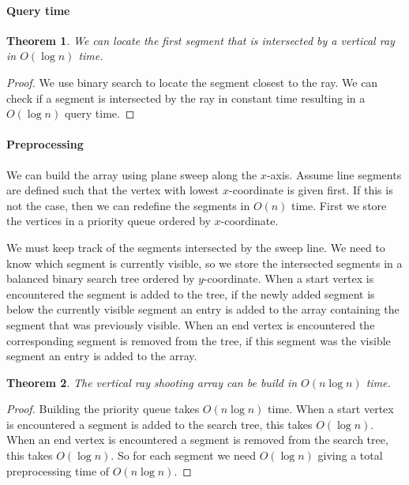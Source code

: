 \documentclass[10pt,a4paper,final,oneside,openany,article,oldfontcommands]{memoir}
\newtheorem{rayshooting}{Theorem}
\begin{document}
\paragraph{Query time}
\begin{rayshooting}
  We can locate the first segment that is intersected by a vertical ray in $O(\log n)$ time.
\end{rayshooting}
\begin{proof}
We use binary search to locate the segment closest to the ray. We can check if a segment is intersected by the ray in constant time resulting in a $O(\log n)$ query time.
\end{proof}


\paragraph{Preprocessing}
We can build the array using plane sweep along the $x$-axis. Assume line segments are defined such that the vertex with lowest $x$-coordinate is given first. If this is not the case, then we can redefine the segments in $O(n)$ time. First we store the vertices in a priority queue ordered by $x$-coordinate.

We must keep track of the segments intersected by the sweep line. We need to know which segment is currently visible, so we store the intersected segments in a balanced binary search tree ordered by $y$-coordinate.
When a start vertex is encountered the segment is added to the tree, if the newly added segment is below the currently visible segment an entry is added to the array containing the segment that was previously visible.
When an end vertex is encountered the corresponding segment is removed from the tree, if this segment was the visible segment an entry is added to the array.

\begin{rayshooting}
  The vertical ray shooting array can be build in $O(n \log n)$ time.
\end{rayshooting}
\begin{proof}
  Building the priority queue takes $O( n \log n)$ time. 
  When a start vertex is encountered a segment is added to the search tree, this takes $O(\log n)$. When an end vertex is encountered a segment is removed from the search tree, this takes $O(\log n)$. So for each segment we need $O(\log n)$ giving a total preprocessing time of $O(n \log n)$.
\end{proof}
\end{document}
